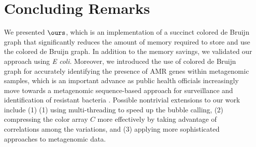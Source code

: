 \section{Concluding Remarks}
\label{p3-sec:conclusion}

We presented $\ours$, which is an implementation of a succinct colored de Bruijn graph that significantly reduces the amount of memory required to store and use the colored de Bruijn graph. In addition to the memory savings, we validated our approach using {\em E coli.} Moreover, we introduced the use of colored de Bruijn graph for accurately identifying the presence of AMR genes within metagenomic samples, which is an important advance as public health officials increasingly move towards a metagenomic sequence-based approach for surveillance and identification of resistant bacteria \cite{baquero_metagenomic_epi, port_2014_metagenomics_AMR_monitoring,FAOActionPlan2016}. Possible nontrivial extensions to our work include (1)
(1) using multi-threading to speed up the bubble calling, (2) compressing the color array $C$ more effectively by taking advantage of correlations among the variations, and (3) applying more sophisticated approaches to metagenomic data.





